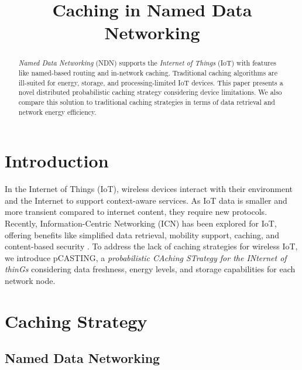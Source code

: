 \documentclass[conference]{IEEEtran}
\begin{document}
\title{Caching in Named Data Networking\\
}

\author{
}

\maketitle

\begin{abstract}

\textit{Named Data Networking} (NDN) supports the \textit{Internet of Things} (IoT) with features like named-based routing 
and in-network caching. Traditional caching algorithms are ill-suited for energy, storage, and processing-limited IoT devices. 
This paper presents a novel distributed probabilistic caching strategy considering device limitations. We also compare this solution 
to traditional caching strategies in terms of data retrieval and network energy efficiency.
\end{abstract}

\section{Introduction}

In the Internet of Things (IoT), wireless devices interact with their environment and the Internet to support context-aware services. 
As IoT data is smaller and more transient compared to internet content, they require new protocols. Recently, Information-Centric Networking (ICN) has been explored 
for IoT, offering benefits like simplified data retrieval, mobility support, caching, and content-based security \cite{b2, b3, b4}. To address the lack of 
caching strategies for wireless IoT, we introduce pCASTING, a \textit{probabilistic CAching STrategy for the INternet of thinGs} considering data freshness, energy levels, 
and storage capabilities for each network node.

\section{Caching Strategy}

\subsection{Named Data Networking}
\end{document}
